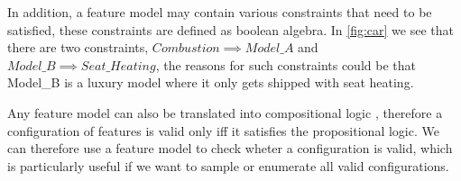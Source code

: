 In addition, a feature model may contain various constraints that need to be satisfied, these constraints are defined as boolean 
algebra. In \ref{fig:car} we see that there are two constraints, $Combustion \implies Model\_A$ and 
$Model\_B \implies Seat\_Heating$, the reasons for such constraints could be that Model\_B is a luxury model where it only gets shipped
with seat heating.

Any feature model can also be translated into compositional logic \cite*{Feature-Oriented-Software-Product-Lines-Feature-models}, therefore a
configuration of features is valid only iff it satisfies the propositional logic. We can therefore use a feature model to check wheter a 
configuration is valid, which is particularly useful if we want to sample or enumerate all valid configurations. 
